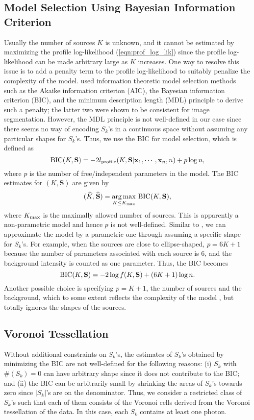 \documentclass{aastex61}
\begin{document}
\subsection{Model Selection Using Bayesian Information Criterion}\label{sec:BIC}
Usually the number of sources $K$ is unknown, and it cannot be estimated by maximizing the profile log-likelihood (\ref{eqn:prof_log_lik}) since the profile log-likelihood can be made arbitrary large as $K$ increases.
One way to resolve this issue is to add a penalty term to the profile log-likelihood to suitably penalize the complexity of the model. \citet{Aue-11} used information theoretic model selection methods such as the Akaike information criterion (AIC), the Bayesian information criterion (BIC), and the minimum description length (MDL) principle to derive such a penalty; the latter two were shown to be consistent for image segmentation.
However, the MDL principle is not well-defined in our case since there seems no way of encoding $S_k$'s in a continuous space without assuming any particular shapes for $S_k$'s. Thus, we use the BIC for model selection, which is defined as
$${\rm BIC}(K, \mathbf{S})=-2l_{\rm profile}(K, \mathbf{S}|\mathbf{x}_1, \cdots, \mathbf{x}_n, n)+p\log n,$$
where $p$ is the number of free/independent parameters in the model. The BIC estimates for $(K, \mathbf{S})$ are given by
$$(\widehat{K}, \widehat{\mathbf{S}})=\underset{K\leq K_{\rm max}}{\operatorname{arg\, max}}~{\rm BIC}(K, \mathbf{S}),$$
where $K_{\rm max}$ is the maximally allowed number of sources.
This is apparently a non-parametric model and hence $p$ is not well-defined. Similar to \citet{Aue-11}, we can approximate the model by a parametric one through assuming a specific shape for $S_k$'s.
For example, when the sources are close to ellipse-shaped, $p=6K+1$ because 
the number of parameters associated with each source is $6$, and the background intensity is counted as one parameter. Thus, the BIC becomes
$${\rm BIC}(K, \mathbf{S})=-2\log f(K, \mathbf{S})+(6K+1)\log n.$$
 Another possible choice is specifying $p=K+1$, the number of sources and the background, which to some extent reflects the complexity
of the model \citep{Magnussen-06}, but totally ignores the shapes of the sources.

\subsection{Voronoi Tessellation}
Without additional constraints on $S_k$'s, the estimates of $S_k$'s obtained by minimizing the BIC are not well-defined for the following reasons: (i) $S_k$ with $\#(S_k)=0$ can have arbitrary shape 
since it does not contribute to the BIC; and (ii) the BIC can be arbitrarily small by shrinking the areas of $S_k$'s towards zero since $|S_k|$'s are on the denominator. Thus, we consider a restricted class of $S_k$'s such that each of them consists of the Voronoi cells derived from the Voronoi tessellation of the data. In this case, each $S_k$ contains at least one photon.
\end{document}
